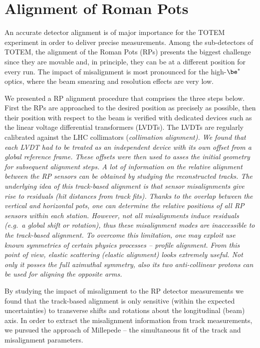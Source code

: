 \chapter[al]{Alignment of Roman Pots}

An accurate detector alignment is of major importance for the TOTEM experiment in order to deliver precise measurements. Among the sub-detectors of TOTEM, the alignment of the Roman Pots (RPs) presents the biggest challenge since they are movable and, in principle, they can be at a different position for every run. The impact of misalignment is most pronounced for the high-$\be^*$ optics, where the beam smearing and resolution effects are very low.

We presented a RP alignment procedure that comprises the three steps below.
\bitm
\itm First the RPs are approached to the desired position as precisely as possible, then their position with respect to the beam is verified with dedicated devices such as the linear voltage differential transformers (LVDTs). The LVDTs are regularly calibrated against the LHC collimators (\em{collimation alignment}). We found that each LVDT had to be treated as an independent device with its own offset from a global reference frame. These offsets were then used to asses the initial geometry for subsequent alignment steps.
%
\itm A lot of information on the relative alignment between the RP sensors can be obtained by studying the reconstructed tracks. The underlying idea of this \em{track-based alignment} is that sensor misalignments give rise to residuals (hit distances from track fits). Thanks to the overlap between the vertical and horizontal pots, one can determine the relative positions of all RP sensors within each station.
%
\itm However, not all misalignments induce residuals (e.g.~a global shift or rotation), thus these misalignment modes are inaccessible to the track-based alignment. To overcome this limitation, one may exploit use known symmetries of certain physics processes -- \em{profile alignment}. From this point of view, elastic scattering (\em{elastic alignment}) looks extremely useful. Not only it posses the full azimuthal symmetry, also its two anti-collinear protons can be used for aligning the opposite arms.
\eitm

\vskip1mm
By studying the impact of misalignment to the RP detector measurements we found that the track-based alignment is only sensitive (within the expected uncertainties) to transverse shifts and rotations about the longitudinal (beam) axis. In order to extract the misalignment information from track measurements, we pursued the approach of Millepede  -- the simultaneous fit of the track and misalignment parameters.

